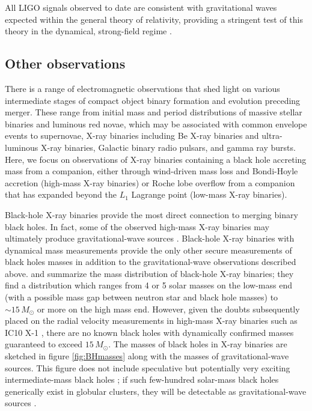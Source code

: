 \documentclass[iop,onecolumn]{revtex4}
\newcommand{\todo}[1]{\textcolor{red}{#1}}
\begin{document}
All LIGO signals observed to date are consistent with gravitational waves expected within the general theory of relativity, providing a stringent test of this theory in the dynamical, strong-field regime \citep{GW150914:GR}.

\subsection{Other observations}

There is a range of electromagnetic observations that shed light on various intermediate stages of compact object binary formation and evolution preceding merger.  These range from initial mass and period distributions of massive stellar binaries \citep[e.g.,][]{Sana:2012} and luminous red novae, which may be associated with common envelope events \citep{Ivanova:2013LRN} to supernovae, X-ray binaries including Be X-ray binaries and ultra-luminous X-ray binaries, Galactic binary radio pulsars, and gamma ray bursts.  Here, we focus on observations of X-ray binaries containing a black hole accreting mass from a companion, either through wind-driven mass loss and Bondi-Hoyle accretion (high-mass X-ray binaries) or Roche lobe overflow from a companion that has expanded beyond the $L_1$ Lagrange point  (low-mass X-ray binaries).   

Black-hole X-ray binaries provide the most direct connection to merging binary black holes.  In fact, some of the observed high-mass X-ray binaries may ultimately produce gravitational-wave sources \citep{CygnusX3:2012}.  Black-hole X-ray binaries with dynamical mass measurements provide the only other secure measurements of black holes masses in addition to the gravitational-wave observations described above.  \citet{Ozel:2010} and \citet{Farr:2011} summarize the mass distribution of black-hole X-ray binaries; they find a distribution which ranges from 4 or 5 solar masses on the low-mass end (with a possible mass gap between neutron star and black hole masses) to $\sim 15\, M_\odot$ or more on the high mass end.  However, given the doubts subsequently placed on the radial velocity measurements in high-mass X-ray binaries such as IC10 X-1 \citep{Laycock:2015}, there are no known black holes with dynamically confirmed masses guaranteed to exceed $15\, M_\odot$.  The masses of black holes in X-ray binaries are sketched in figure \ref{fig:BHmasses} along with the masses of gravitational-wave sources.  This figure does not include speculative but potentially very exciting intermediate-mass black holes \citep{MillerColbert:2004,Pasham:2014}; if such few-hundred solar-mass black holes generically exist in globular clusters, they will be detectable as gravitational-wave sources \citep[e.g.,][]{Mandel:2008}.
\end{document}
